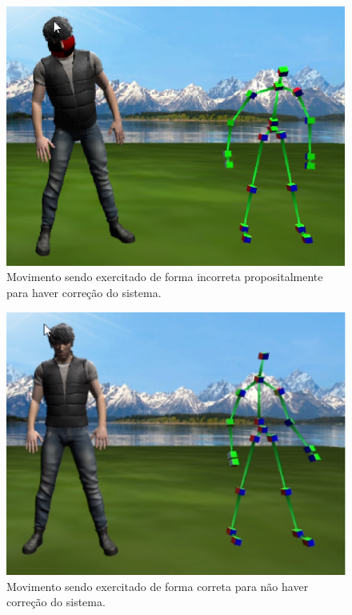   \begin{figure}[H]
  \centering
  \includegraphics [keepaspectratio=true,scale=1]{figuras/cabecaErrada.eps}
  \caption{Movimento sendo exercitado de forma incorreta propositalmente para haver correção do sistema.}
  \label{img:cabecaErrada}
  \end{figure}

  \begin{figure}[H]
  \centering
  \includegraphics [keepaspectratio=true,scale=0.60]{figuras/cabecaCerta.eps}
  \caption{Movimento sendo exercitado de forma correta para não haver correção do sistema.}
  \label{img:cabecaCerta}
  \end{figure}


